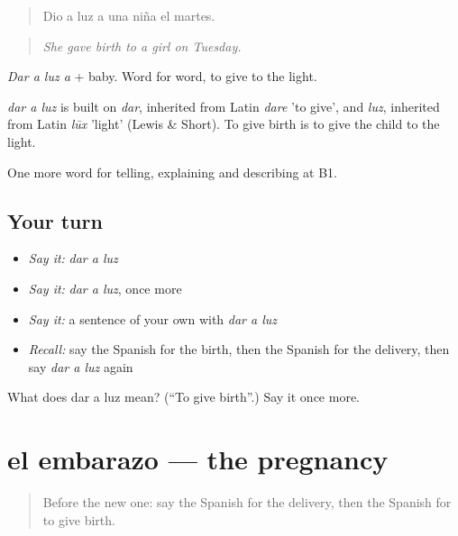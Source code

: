 \begin{quote}
Dio a luz a una niña el martes.
\end{quote}

\begin{quote}
\emph{She gave birth to a girl on Tuesday.}
\end{quote}

\emph{Dar a luz a} + baby. Word for word, to give to the light.

\begin{cousinweb}
\emph{dar a luz} is built on \emph{dar}, inherited from Latin \emph{dare} 'to give', and \emph{luz}, inherited from Latin \emph{lūx} 'light' (Lewis \& Short). To give birth is to give the child to the light.
\end{cousinweb}

\begin{grammarlens}[title={What you've built}]
One more word for telling, explaining and describing at B1.
\end{grammarlens}

\subsection*{Your turn}
\begin{itemize}
\raggedright
  \item \emph{Say it:} \emph{dar a luz}
  \item \emph{Say it:} \emph{dar a luz}, once more
  \item \emph{Say it:} a sentence of your own with \emph{dar a luz}
  \item \emph{Recall:} say the Spanish for the birth, then the Spanish for the delivery, then say \emph{dar a luz} again
\end{itemize}

\begin{tcolorbox}[breakable,colback=teal!4,colframe=teal!35!black,title={Before you move on}]
What does dar a luz mean? (\textquotedblleft{}To give birth\textquotedblright{}.) Say it once more.
\end{tcolorbox}
\section[el embarazo]{el embarazo — the pregnancy}

\label{lesson:ES-C544-embarazo}



\begin{quote}
Before the new one: say the Spanish for the delivery, then the Spanish for to give birth.
\end{quote}

